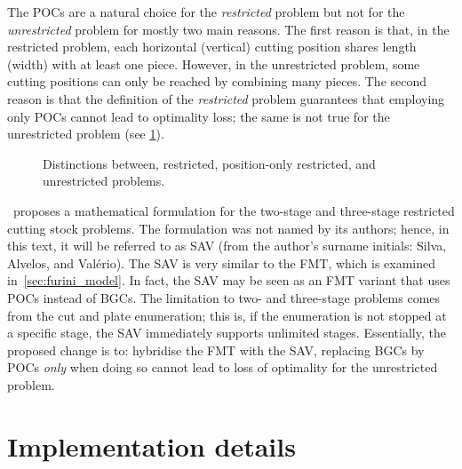 \documentclass[ppgc,tese,english,formais,babel]{iiufrgs}
\begin{document}
The POCs are a natural choice for the \emph{restricted} problem but not for the \emph{unrestricted} problem for mostly two main reasons.
The first reason is that, in the restricted problem, each horizontal (vertical) cutting position shares length (width) with at least one piece.
However, in the unrestricted problem, some cutting positions can only be reached by combining many pieces.
The second reason is that the definition of the \emph{restricted} problem guarantees that employing only POCs cannot lead to optimality loss; the same is not true for the unrestricted problem (see \cref{fig:distinctions_restricted_unrestricted}).

\begin{figure}[h]
  \caption{Distinctions between, restricted, position-only restricted, and unrestricted problems.}
  \center
  
  \label{fig:distinctions_restricted_unrestricted}
\end{figure}

\citet{silva:2010}~proposes a mathematical formulation for the two-stage and three-stage restricted cutting stock problems.
The formulation was not named by its authors; hence, in this text, it will be referred to as SAV (from the author's surname initials: Silva, Alvelos, and Valério).
The SAV is very similar to the FMT, which is examined in~\cref{sec:furini_model}.
In fact, the SAV may be seen as an FMT variant that uses POCs instead of BGCs.
The limitation to two- and three-stage problems comes from the cut and plate enumeration; this is, if the enumeration is not stopped at a specific stage, the SAV immediately supports unlimited stages.
Essentially, the proposed change is to: hybridise the FMT with the SAV, replacing BGCs by POCs \emph{only} when doing so cannot lead to loss of optimality for the unrestricted problem.

\section{Implementation details}
\end{document}
